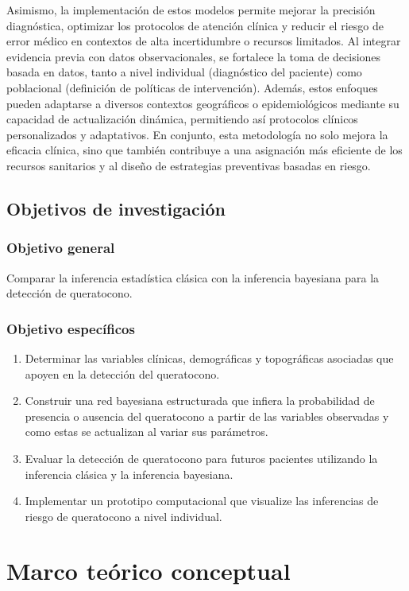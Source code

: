 Asimismo, la implementación de estos modelos permite mejorar la precisión diagnóstica, optimizar los protocolos de atención clínica y reducir el riesgo de error médico en contextos de alta incertidumbre o recursos limitados. Al integrar evidencia previa con datos observacionales, se fortalece la toma de decisiones basada en datos, tanto a nivel individual (diagnóstico del paciente) como poblacional (definición de políticas de intervención). Además, estos enfoques pueden adaptarse a diversos contextos geográficos o epidemiológicos mediante su capacidad de actualización dinámica, permitiendo así protocolos clínicos personalizados y adaptativos. En conjunto, esta metodología no solo mejora la eficacia clínica, sino que también contribuye a una asignación más eficiente de los recursos sanitarios y al diseño de estrategias preventivas basadas en riesgo.



\subsection{Objetivos de investigación}
\subsubsection{Objetivo general}
Comparar la inferencia estadística clásica con la inferencia bayesiana para la detección de queratocono.

\subsubsection{Objetivo específicos}
\begin{enumerate}
\item Determinar las variables clínicas, demográficas y topográficas asociadas que apoyen en la detección del queratocono.
\item Construir una red bayesiana estructurada que infiera la probabilidad de presencia o ausencia del queratocono a partir de las variables observadas y como estas se actualizan al variar sus parámetros.
\item Evaluar la detección de queratocono para futuros pacientes utilizando la inferencia clásica y la inferencia bayesiana.
\item Implementar un prototipo computacional que visualize las inferencias de riesgo de queratocono a nivel individual.
\end{enumerate}

\newpage
\section{Marco teórico conceptual}
